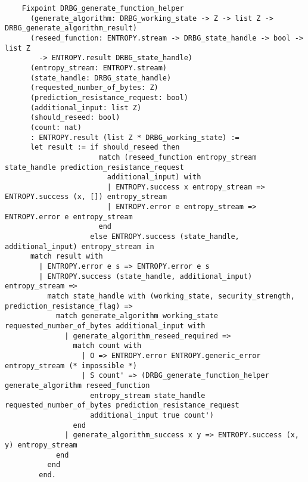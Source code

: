 \documentclass[pageno]{jpaper}
\begin{document}
\begin{lstlisting}
    Fixpoint DRBG_generate_function_helper
      (generate_algorithm: DRBG_working_state -> Z -> list Z -> DRBG_generate_algorithm_result)
      (reseed_function: ENTROPY.stream -> DRBG_state_handle -> bool -> list Z
        -> ENTROPY.result DRBG_state_handle)
      (entropy_stream: ENTROPY.stream)
      (state_handle: DRBG_state_handle)
      (requested_number_of_bytes: Z)
      (prediction_resistance_request: bool)
      (additional_input: list Z)
      (should_reseed: bool)
      (count: nat)
      : ENTROPY.result (list Z * DRBG_working_state) :=
      let result := if should_reseed then
                      match (reseed_function entropy_stream state_handle prediction_resistance_request
                        additional_input) with
                        | ENTROPY.success x entropy_stream => ENTROPY.success (x, []) entropy_stream
                        | ENTROPY.error e entropy_stream => ENTROPY.error e entropy_stream
                      end
                    else ENTROPY.success (state_handle, additional_input) entropy_stream in
      match result with
        | ENTROPY.error e s => ENTROPY.error e s
        | ENTROPY.success (state_handle, additional_input) entropy_stream =>
          match state_handle with (working_state, security_strength, prediction_resistance_flag) =>
            match generate_algorithm working_state requested_number_of_bytes additional_input with
              | generate_algorithm_reseed_required =>
                match count with
                  | O => ENTROPY.error ENTROPY.generic_error entropy_stream (* impossible *)
                  | S count' => (DRBG_generate_function_helper generate_algorithm reseed_function
                    entropy_stream state_handle requested_number_of_bytes prediction_resistance_request
                    additional_input true count')
                end
              | generate_algorithm_success x y => ENTROPY.success (x, y) entropy_stream
            end
          end
        end.


\end{lstlisting}
\end{document}
